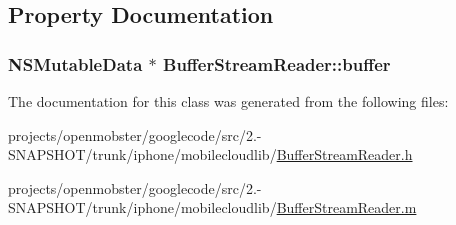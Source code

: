 \subsection{\-Property \-Documentation}
\hypertarget{interface_buffer_stream_reader_a9a4a1ea1471f72ade325999dc39fd420}{
\subsubsection[{buffer}]{\setlength{\rightskip}{0pt plus 5cm}\-N\-S\-Mutable\-Data $\ast$ \-Buffer\-Stream\-Reader\-::buffer}}
\label{interface_buffer_stream_reader_a9a4a1ea1471f72ade325999dc39fd420}


\-The documentation for this class was generated from the following files\-:\begin{DoxyCompactItemize}
\item 
projects/openmobster/googlecode/src/2.-\/\-S\-N\-A\-P\-S\-H\-O\-T/trunk/iphone/mobilecloudlib/\hyperlink{_buffer_stream_reader_8h}{\-Buffer\-Stream\-Reader.\-h}\item 
projects/openmobster/googlecode/src/2.-\/\-S\-N\-A\-P\-S\-H\-O\-T/trunk/iphone/mobilecloudlib/\hyperlink{_buffer_stream_reader_8m}{\-Buffer\-Stream\-Reader.\-m}\end{DoxyCompactItemize}
